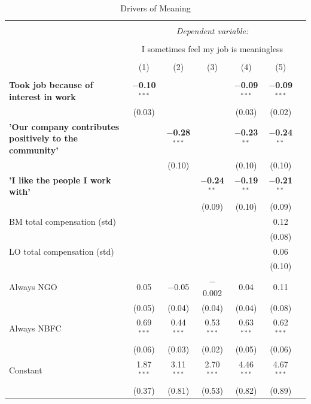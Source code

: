 \documentclass[12pt]{article}
\begin{document}
\begin{table}[!htbp] \centering 
  \caption{Drivers of Meaning} 
  \label{} 
\footnotesize 
\begin{tabular}{p{7cm}cccccc} 
\\[-1.8ex]\hline 
\hline \\[-1.8ex] 
 & \multicolumn{5}{c}{\textit{Dependent variable:}} \\ 
\cline{2-6} 
\\[-1.8ex] & \multicolumn{5}{c}{I sometimes feel my job is meaningless} \\ 
\\[-1.8ex] & (1) & (2) & (3) & (4) & (5)\\ 
\hline \\[-1.8ex] 
 \textbf{Took job because of interest in work} & \textbf{$-$0.10$^{***}$} &  &  & \textbf{$-$0.09$^{***}$} & \textbf{$-$0.09$^{***}$} \\ 
  & (0.03) &  &  & (0.03) & (0.02) \\ 
  \textbf{'Our company contributes positively to the community'} &  & \textbf{$-$0.28$^{***}$} &  & \textbf{$-$0.23$^{**}$} & \textbf{$-$0.24$^{**}$} \\ 
  &  & (0.10) &  & (0.10) & (0.10) \\ 
  \textbf{'I like the people I work with'} &  &  & \textbf{$-$0.24$^{**}$} & \textbf{$-$0.19$^{**}$} & \textbf{$-$0.21$^{**}$} \\ 
  &  &  & (0.09) & (0.10) & (0.09) \\ 
  BM total compensation (std) &  &  &  &  & 0.12 \\ 
  &  &  &  &  & (0.08) \\ 
  LO total compensation (std) &  &  &  &  & 0.06 \\ 
  &  &  &  &  & (0.10) \\ 
  Always NGO & 0.05 & $-$0.05 & $-$0.002 & 0.04 & 0.11 \\ 
  & (0.05) & (0.04) & (0.04) & (0.04) & (0.08) \\ 
  Always NBFC & 0.69$^{***}$ & 0.44$^{***}$ & 0.53$^{***}$ & 0.63$^{***}$ & 0.62$^{***}$ \\ 
  & (0.06) & (0.03) & (0.02) & (0.05) & (0.06) \\ 
  Constant & 1.87$^{***}$ & 3.11$^{***}$ & 2.70$^{***}$ & 4.46$^{***}$ & 4.67$^{***}$ \\ 
  & (0.37) & (0.81) & (0.53) & (0.82) & (0.89) \\ 

\end{tabular}
\end{table}
\end{document}
